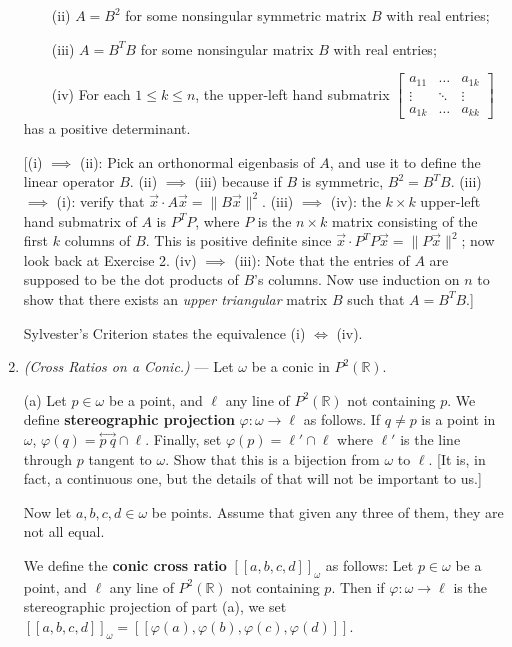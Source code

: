 \documentclass[leqno]{book}
\begin{document}
\begin{enumerate}
~~~~(ii) $A=B^2$ for some nonsingular symmetric matrix $B$ with real entries;

~~~~(iii) $A=B^TB$ for some nonsingular matrix $B$ with real entries;

~~~~(iv) For each $1\leqslant k\leqslant n$, the upper-left hand submatrix $\begin{bmatrix}a_{11}&\dots&a_{1k}\\\vdots&\ddots&\vdots\\a_{1k}&\dots&a_{kk}\end{bmatrix}$ has a positive determinant.

[(i) $\implies$ (ii): Pick an orthonormal eigenbasis of $A$, and use it to define the linear operator $B$.  (ii) $\implies$ (iii) because if $B$ is symmetric, $B^2=B^TB$.  (iii) $\implies$ (i): verify that $\vec x\cdot A\vec x=\|B\vec x\|^2$.  (iii) $\implies$ (iv): the $k\times k$ upper-left hand submatrix of $A$ is $P^TP$, where $P$ is the $n\times k$ matrix consisting of the first $k$ columns of $B$.  This is positive definite since $\vec x\cdot P^TP\vec x=\|P\vec x\|^2$; now look back at Exercise 2.  (iv) $\implies$ (iii): Note that the entries of $A$ are supposed to be the dot products of $B$'s columns.  Now use induction on $n$ to show that there exists an \emph{upper triangular} matrix $B$ such that $A=B^TB$.] %

Sylvester's Criterion states the equivalence (i) $\iff$ (iv).

\item\emph{(Cross Ratios on a Conic.)} \---- Let $\omega$ be a conic in $P^2(\mathbb R)$.

(a) Let $p\in\omega$ be a point, and $\ell$ any line of $P^2(\mathbb R)$ not containing $p$.  We define \textbf{stereographic projection} $\varphi:\omega\to\ell$ as follows.  If $q\ne p$ is a point in $\omega$, $\varphi(q)=\overset{\longleftrightarrow}{p~q}\cap\ell$.  Finally, set $\varphi(p)=\ell'\cap\ell$ where $\ell'$ is the line through $p$ tangent to $\omega$.  Show that this is a bijection from $\omega$ to $\ell$.  [It is, in fact, a continuous one, but the details of that will not be important to us.]

Now let $a,b,c,d\in\omega$ be points.  Assume that given any three of them, they are not all equal.

We define the \textbf{conic cross ratio} $[\![a,b,c,d]\!]_\omega$ as follows: Let $p\in\omega$ be a point, and $\ell$ any line of $P^2(\mathbb R)$ not containing $p$.  Then if $\varphi:\omega\to\ell$ is the stereographic projection of part (a), we set $[\![a,b,c,d]\!]_\omega=[\![\varphi(a),\varphi(b),\varphi(c),\varphi(d)]\!]$.


\end{enumerate}
\end{document}
